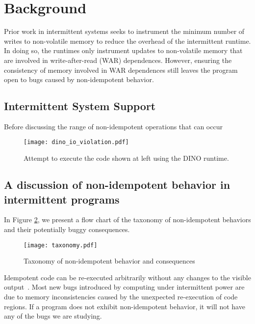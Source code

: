 \section{Background}
Prior work in intermittent systems seeks to instrument the minimum number of
writes to non-volatile memory to reduce the overhead of the intermittent
runtime. In doing so, the runtimes only instrument updates to non-volatile
memory that are involved in write-after-read (WAR) dependences. However,
ensuring the consistency of memory involved in WAR dependences still leaves the
program open to bugs caused by non-idempotent behavior.

\subsection{Intermittent System Support}
Before discussing the range of non-idempotent operations that can occur

\begin{figure}[htb]
\centering
\texttt{[image: dino\_io\_violation.pdf]}
\caption{Attempt to execute the code shown at left using the DINO runtime.}
\label{fig:dino}
\end{figure}

\subsection{A discussion of non-idempotent behavior in intermittent programs}

In Figure \ref{fig:tax}, we present a flow chart of the taxonomy of non-idempotent behaviors and their potentially buggy consequences. 

\begin{figure}[ht]
\centering
\texttt{[image: taxonomy.pdf]}
\caption{Taxonomy of non-idempotent behavior and consequences}
\label{fig:tax}
\end{figure}
Idempotent code can be re-executed arbitrarily without any changes to the
visible output~\cite{ratchet,dino}. Most new bugs introduced by computing under
intermittent power are due to memory inconsistencies caused by the unexpected
re-execution of code regions. If a program does not exhibit non-idempotent
behavior, it will not have any of the bugs we are studying.


